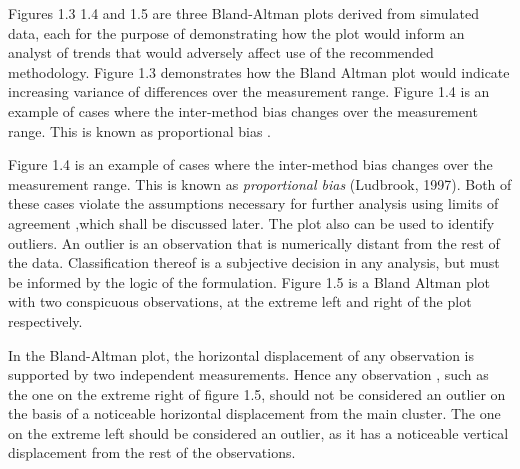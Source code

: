 \documentclass{report}
\begin{document}
Figures 1.3 1.4 and 1.5 are three Bland-Altman plots derived from
simulated data, each for the purpose of demonstrating how the plot
would inform an analyst of trends that would adversely affect use
of the recommended methodology. Figure 1.3 demonstrates how the
Bland Altman plot would indicate increasing variance of
differences over the measurement range. Figure 1.4 is an example
of cases where the inter-method bias changes over the measurement
range. This is known as proportional bias \citep{ludbrook97}.


%

\newpage
Figure 1.4 is an example of cases where the inter-method bias
changes over the measurement range. This is known as\textit{ proportional
bias} (Ludbrook, 1997). Both of these cases violate the assumptions
necessary for further analysis using limits of agreement ,which
shall be discussed later. The plot also can be used to identify
outliers. An outlier is an observation that is numerically distant
from the rest of the data. Classification thereof is a subjective
decision in any analysis, but must be informed by the logic of the
formulation. Figure 1.5 is a Bland Altman plot with two
conspicuous observations, at the extreme left and right of the
plot respectively.



In the Bland-Altman plot, the horizontal displacement of any
observation is supported by two independent measurements. Hence
any observation , such as the one on the extreme right of figure
1.5, should not be considered an outlier on the basis of a
noticeable horizontal displacement from the main cluster. The one
on the extreme left should be considered an outlier, as it has a
noticeable vertical displacement from the rest of the
observations.
\end{document}
